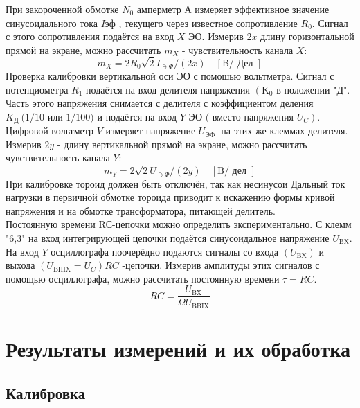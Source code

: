 \documentclass[12pt]{article}
\begin{document}
При закороченной обмотке $N_{0}$ амперметр А измеряет эффективное значение синусоидального тока $I$эф , текущего через известное сопротивление $R_{0} .$ Сигнал с этого сопротивления подаётся на вход $X$ ЭО. Измерив $2 x$ длину горизонтальной прямой на экране, можно рассчитать $m_{X}$ - чувствительность канала $X:$
$$
m_{X}=2 R_{0} \sqrt{2} I_{\ni \Phi} /(2 x) \quad[\mathrm{B} / \text { Дел }]
$$
Проверка калибровки вертикальной оси ЭО с помошью вольтметра. Сигнал с потенциометра $R_{1}$ подаётся на вход делителя напряжения $\left(\mathrm{K}_{0}\right.$ в положении "Д". Часть этого напряжения снимается с делителя с коэффициентом деления $K_{\text {Д }}(1 / 10$ или $1 / 100)$ и подаётся на вход $Y$ ЭО $($ вместо напряжения $\left.U_{C}\right) .$ Цифровой вольтметр $V$ измеряет напряжение $U_{\text {ЭФ }}$ на этих же клеммах делителя. Измерив $2 y$ - длину вертикальной прямой на экране, можно рассчитать чувствительность канала $Y:$
$$
m_{Y}=2 \sqrt{2} U_{\ni \Phi} /(2 y) \quad[\mathrm{B} / \text { дел }]
$$
При калибровке тороид должен быть отключён, так как несинусои Дальный ток нагрузки в первичной обмотке тороида приводит к искажению формы кривой напряжения и на обмотке трансформатора, питающей делитель.\\
Постоянную времени RС-цепочки можно определить экспериментально. С клемм "6,3" на вход интегрирующей цепочки подаётся синусоидальное напряжение $U_{\mathrm{BX}} .$ На вход $Y$ осциллографа поочерёдно подаются сигналы со входа $\left(U_{\mathrm{BX}}\right)$ и выхода $\left(U_{\mathrm{BHIX}}=U_{C}\right) R C$ -цепочки. Измерив амплитуды этих сигналов с помощью осциллографа, можно рассчитать постоянную времени $\tau=R C .$
$$
R C=\frac{U_{\mathrm{BX}}}{\Omega U_{\mathrm{BBIX}}}
$$

\section{Результаты измерений и их обработка}
\subsection{Калибровка}
\end{document}
